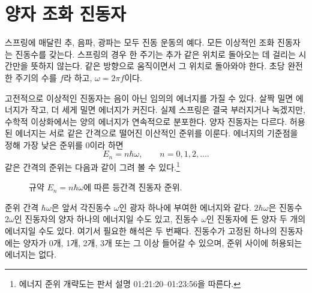 \begin{classroomqa}\end{classroomqa}

\section{양자 조화 진동자}

스프링에 매달린 추, 음파, 광파는 모두 진동 운동의 예다. 모든 이상적인 조화 진동자는 진동수를 갖는다. 스프링의 경우 한 주기는 추가 같은 위치로 돌아오는 데 걸리는 시간만을 뜻하지 않는다. 같은 방향으로 움직이면서 그 위치로 돌아와야 한다. 초당 완전한 주기의 수를 \(f\)라 하고, \(\omega=2\pi f\)이다.

고전적으로 이상적인 진동자는 음이 아닌 임의의 에너지를 가질 수 있다. 살짝 밀면 에너지가 작고, 더 세게 밀면 에너지가 커진다. 실제 스프링은 결국 부러지거나 녹겠지만, 수학적 이상화에서는 양의 에너지가 연속적으로 분포한다. 양자 진동자는 다르다. 허용된 에너지는 서로 같은 간격으로 떨어진 이산적인 준위를 이룬다. 에너지의 기준점을 정해 가장 낮은 준위를 0이라 하면 \begin{equation}
E_n=n\hbar\omega,
\qquad n=0,1,2,\ldots .
\end{equation} 같은 간격의 준위는 다음과 같이 그려 볼 수 있다.\footnote{에너지 준위 개략도는 판서 설명 01:21:20--01:23:56을 따른다.}

\begin{figure}[t]\centering
{}\caption{규약 \(E_n=n\hbar\omega\)에 따른 등간격 진동자 준위.}\end{figure}

준위 간격 \(\hbar\omega\)은 앞서 각진동수 \(\omega\)인 광자 하나에 부여한 에너지와 같다. \(2\hbar\omega\)은 진동수 \(2\omega\)인 진동자의 양자 하나의 에너지일 수도 있고, 진동수 \(\omega\)인 진동자에 든 양자 두 개의 에너지일 수도 있다. 여기서 필요한 해석은 두 번째다. 진동수가 고정된 하나의 진동자에는 양자가 0개, 1개, 2개, 3개 또는 그 이상 들어갈 수 있으며, 준위 사이에 허용되는 에너지는 없다.

